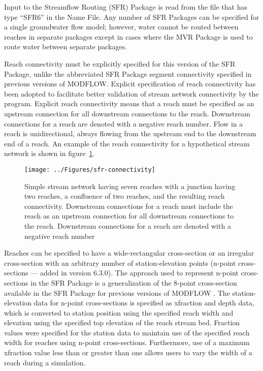 Input to the Streamflow Routing (SFR) Package is read from the file that has type ``SFR6'' in the Name File. Any number of SFR Packages can be specified for a single groundwater flow model; however, water cannot be routed between reaches in separate packages except in cases where the MVR Package is used to route water between separate packages.

Reach connectivity must be explicitly specified for this version of the SFR Package, unlike the abbreviated SFR Package segment connectivity specified in previous versions of MODFLOW. Explicit specification of reach connectivity has been adopted to facilitate better validation of stream network connectivity by the program. Explicit reach connectivity means that a reach must be specified as an upstream connection for all downstream connections to the reach. Downstream connections for a reach are denoted with a negative reach number. Flow in a reach is unidirectional, always flowing from the upstream end to the downstream end of a reach. An example of the reach connectivity for a hypothetical stream network is shown in figure~\ref{fig:sfr-connectivity}.

\begin{figure}[ht]
	\centering
	\texttt{[image: ../Figures/sfr-connectivity]}
	\caption[Illustration of a simple stream network having seven reaches with a junction having two reaches, a confluence of two reaches, and the resulting reach connectivity]{Simple stream network having seven reaches with a junction having two reaches, a confluence of two reaches, and the resulting reach connectivity. Downstream connections for a reach must include the reach as an upstream connection for all downstream connections to the reach. Downstream connections for a  reach are denoted with a negative reach number}
	\label{fig:sfr-connectivity}
\end{figure}

Reaches can be specified to have a wide-rectangular cross-section or an irregular cross-section with an arbitrary number of station-elevation points (n-point cross-sections --- added in version 6.3.0). The approach used to represent n-point cross-sections in the SFR Package is a generalization of the 8-point cross-section available in the SFR Package for previous versions of MODFLOW \citep{modflowsfr1pack}. The station-elevation data for n-point cross-sections is specified as xfraction and depth data, which is converted to station position using the specified reach width and elevation using the specified top elevation of the reach stream bed. Fraction values were specified for the station data to maintain use of the specified reach width for reaches using n-point cross-sections. Furthermore, use of a maximum xfraction value less than or greater than one allows users to vary the width of a reach during a simulation.

